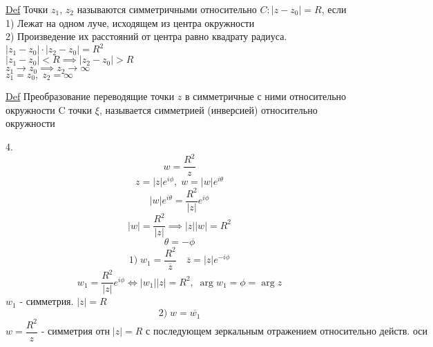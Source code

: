 \documentclass[a4paper]{article}
\begin{document}
\underline{Def} Точки $ z_1, \, z_2 $ называются симметричными относительно 
$ C: |z - z_0| = R $, если \\
1) Лежат на одном луче, исходящем из центра окружности\\
2) Произведение их расстояний от центра равно квадрату радиуса. $ |z_1 - z_0| \cdot
|z_2 - z_0| = R^2$ \\
$ |z_1 - z_0| < R \implies |z_2 - z_0| > R $ \\
$ z_1 \rightarrow z_0 \implies z_2 \rightarrow \infty $ \\
$ z_1 = z_0, \; z_2 = \infty $ 

\underline{Def} Преобразование переводящие точки $ z $ в симметричные с ними
относительно окружности C точки $ \xi $, называется симметрией (инверсией)
относительно окружности

4.
\[
     w  = \frac{R^2}{z} 
\]
\[
    z = |z| e^{i\phi}, \; w = |w| e^{i\theta}
\]
\[
    |w| e^{i\theta} = \frac{R^2}{|z|} e^{i\phi}
\]
\[
    |w| = \frac{R^2}{|z|} \implies |z||w| = R^2
\]
\[
    \theta = -\phi
\]
\[
    1) \; w_1 = \frac{R^2}{\overline{z}} \quad \overline{z} = |z| e^{-i\phi}
\]
\[
    w_1 = \frac{R^2}{|z|} e^{i\phi} \iff |w_1| |z| = R^2, \; \arg w_1 = \phi = \arg z
\]
$ w_1 $ - симметрия. $ |z| = R $ 
\[
    2) \; w = \overline{w_1}
\]
\[
    w = \frac{R^2}{z} \text{ - симметрия отн} \; |z| = R \text{ с последующем
    зеркальным отражением относительно действ. оси}
\]
\end{document}
